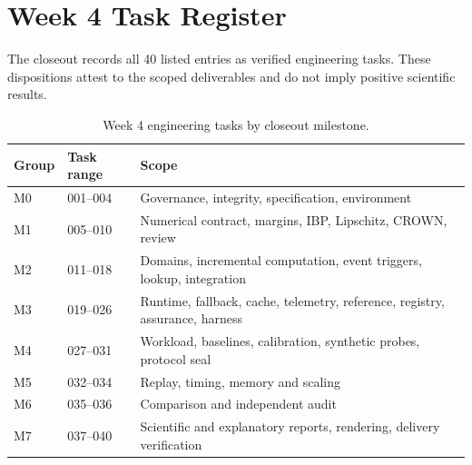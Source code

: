 \section{Week 4 Task Register}
The closeout records all 40 listed entries as verified engineering tasks. These dispositions attest to the scoped deliverables and do not imply positive scientific results.
\begin{table}[H]
\caption{Week 4 engineering tasks by closeout milestone.}
\centering\small
\begin{tabularx}{\columnwidth}{@{}llY@{}}\toprule
Group & Task range & Scope \\
\midrule
M0 & 001--004 & Governance, integrity, specification, environment \\
M1 & 005--010 & Numerical contract, margins, IBP, Lipschitz, CROWN, review \\
M2 & 011--018 & Domains, incremental computation, event triggers, lookup, integration \\
M3 & 019--026 & Runtime, fallback, cache, telemetry, reference, registry, assurance, harness \\
M4 & 027--031 & Workload, baselines, calibration, synthetic probes, protocol seal \\
M5 & 032--034 & Replay, timing, memory and scaling \\
M6 & 035--036 & Comparison and independent audit \\
M7 & 037--040 & Scientific and explanatory reports, rendering, delivery verification \\
\bottomrule\end{tabularx}
\end{table}
